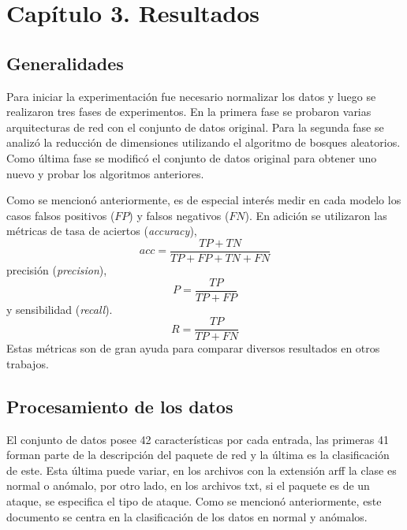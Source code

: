 \chapter*{Capítulo 3. Resultados}\label{chapter:results}

\section{Generalidades}
Para iniciar la experimentación fue necesario normalizar los datos y luego se realizaron tres fases de experimentos. En la primera fase se probaron varias arquitecturas de red con el conjunto de datos original. Para la segunda fase se analizó la reducción de dimensiones utilizando el algoritmo de bosques aleatorios. Como última fase se modificó el conjunto de datos original para obtener uno nuevo y probar los algoritmos anteriores.

Como se mencionó anteriormente, es de especial interés medir en cada modelo los casos falsos positivos ($FP$) y falsos negativos ($FN$). En adición se utilizaron las métricas de tasa de aciertos (\textit{accuracy}), 
\[acc = \frac{TP + TN}{TP + FP + TN + FN}\] 
precisión \cite{salton1983introduction} (\textit{precision}), 
\[P = \frac{TP}{TP + FP}\]
 y sensibilidad \cite{allen1955machine} (\textit{recall}). 
\[R = \frac{TP}{TP + FN}\]
Estas métricas son de gran ayuda para comparar diversos resultados en otros trabajos.

\section{Procesamiento de los datos}
El conjunto de datos posee 42 características por cada entrada, las primeras 41 forman parte de la descripción del paquete de red y la última es la clasificación de este. Esta última puede variar, en los archivos con la extensión arff la clase es normal o anómalo, por otro lado, en los archivos txt, si el paquete es de un ataque, se especifica el tipo de ataque. Como se mencionó anteriormente, este documento se centra en la clasificación de los datos en normal y anómalos.

